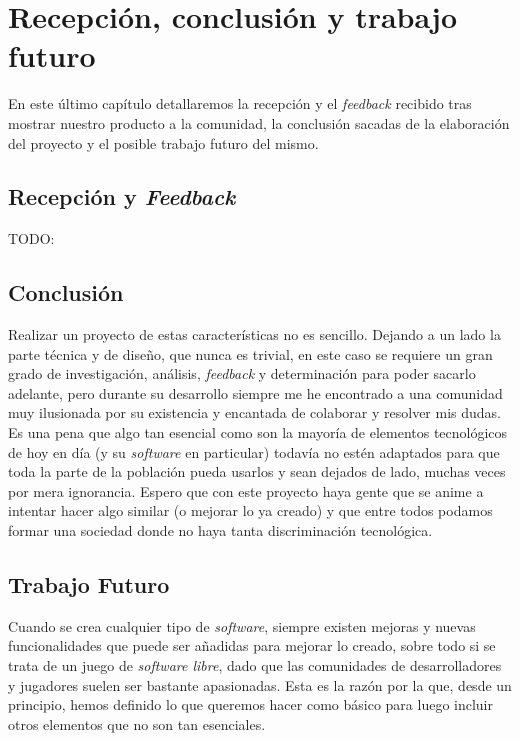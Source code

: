\chapter{Recepción, conclusión y trabajo futuro}

En este último capítulo detallaremos la recepción y el \textit{feedback} recibido tras mostrar nuestro producto a la comunidad, la conclusión sacadas de la elaboración del proyecto y el posible trabajo futuro del mismo.

\section{Recepción y \textit{Feedback}}

TODO:

\section{Conclusión}

Realizar un proyecto de estas características no es sencillo. Dejando a un lado la parte técnica y de diseño, que nunca es trivial, en este caso se requiere un gran grado de investigación, análisis, \textit{feedback} y determinación para poder sacarlo adelante, pero durante su desarrollo siempre me he encontrado a una comunidad muy ilusionada por su existencia y encantada de colaborar y resolver mis dudas. 
Es una pena que algo tan esencial como son la mayoría de elementos tecnológicos de hoy en día (y su \textit{software} en particular) todavía no estén adaptados para que toda la parte de la población pueda usarlos y sean dejados de lado, muchas veces por mera ignorancia. Espero que con este proyecto haya gente que se anime a intentar hacer algo similar (o mejorar lo ya creado) y que entre todos podamos formar una sociedad donde no haya tanta discriminación tecnológica.

\section{Trabajo Futuro}

Cuando se crea cualquier tipo de \textit{software}, siempre existen mejoras y nuevas funcionalidades que puede ser añadidas para mejorar lo creado, sobre todo si se trata de un juego de \textit{software libre}, dado que las comunidades de desarrolladores y jugadores suelen ser bastante apasionadas. Esta es la razón por la que, desde un principio, hemos definido lo que queremos hacer como básico para luego incluir otros elementos que no son tan esenciales.

